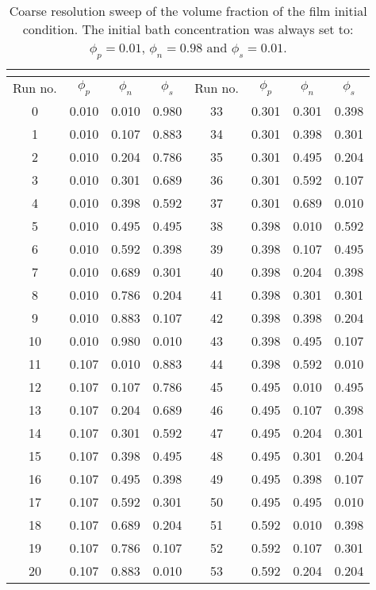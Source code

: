 \documentclass[journal=mamobx,manuscript=suppinfo]{achemso}
\begin{document}
\begin{longtable}{cccc|cccc}
\caption{Coarse resolution sweep of the volume fraction of the film initial condition. 
The initial bath concentration was always set to: $\phi_{p} = 0.01$, $\phi_{n} = 0.98$ and $\phi_{s} = 0.01$.
}\\
\label{tab:coarse}\\
\hline
Run no. & $\phi_{p}$ & $\phi_{n}$ & $\phi_{s}$ & Run no. & $\phi_{p}$ & $\phi_{n}$ & $\phi_{s}$ \\
\hline
0 & 0.010 & 0.010 & 0.980  & 33 & 0.301 & 0.301 & 0.398 \\
1 & 0.010 & 0.107 & 0.883  & 34 & 0.301 & 0.398 & 0.301 \\
2 & 0.010 & 0.204 & 0.786  & 35 & 0.301 & 0.495 & 0.204 \\
3 & 0.010 & 0.301 & 0.689  & 36 & 0.301 & 0.592 & 0.107 \\
4 & 0.010 & 0.398 & 0.592  & 37 & 0.301 & 0.689 & 0.010 \\
5 & 0.010 & 0.495 & 0.495  & 38 & 0.398 & 0.010 & 0.592 \\
6 & 0.010 & 0.592 & 0.398  & 39 & 0.398 & 0.107 & 0.495 \\
7 & 0.010 & 0.689 & 0.301  & 40 & 0.398 & 0.204 & 0.398 \\
8 & 0.010 & 0.786 & 0.204  & 41 & 0.398 & 0.301 & 0.301 \\
9 & 0.010 & 0.883 & 0.107  & 42 & 0.398 & 0.398 & 0.204 \\
10 & 0.010 & 0.980 & 0.010 & 43 & 0.398 & 0.495 & 0.107 \\
11 & 0.107 & 0.010 & 0.883 & 44 & 0.398 & 0.592 & 0.010 \\
12 & 0.107 & 0.107 & 0.786 & 45 & 0.495 & 0.010 & 0.495 \\
13 & 0.107 & 0.204 & 0.689 & 46 & 0.495 & 0.107 & 0.398 \\
14 & 0.107 & 0.301 & 0.592 & 47 & 0.495 & 0.204 & 0.301 \\
15 & 0.107 & 0.398 & 0.495 & 48 & 0.495 & 0.301 & 0.204 \\
16 & 0.107 & 0.495 & 0.398 & 49 & 0.495 & 0.398 & 0.107 \\
17 & 0.107 & 0.592 & 0.301 & 50 & 0.495 & 0.495 & 0.010 \\
18 & 0.107 & 0.689 & 0.204 & 51 & 0.592 & 0.010 & 0.398 \\
19 & 0.107 & 0.786 & 0.107 & 52 & 0.592 & 0.107 & 0.301 \\
20 & 0.107 & 0.883 & 0.010 & 53 & 0.592 & 0.204 & 0.204 \\

\end{longtable}
\end{document}
